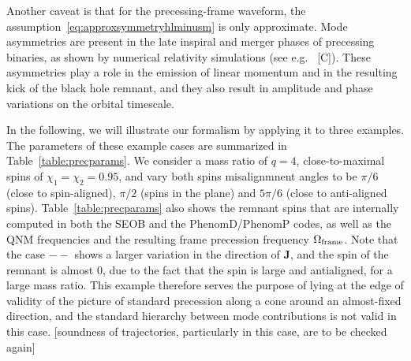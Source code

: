 \documentclass[aps,showpacs,twocolumn,
prd,superscriptaddress,nofootinbib]{revtex4-1}
\newcommand{\SM}[1]{{\color{Red} #1}}
\begin{document}
Another caveat is that for the precessing-frame waveform, the assumption~\eqref{eq:approxsymmetryhlminusm} is only approximate. Mode asymmetries are present in the late inspiral and merger phases of precessing binaries, as shown by numerical relativity simulations (see e.g.~\cite{} \SM{[C]}). These asymmetries play a role in the emission of linear momentum and in the resulting kick of the black hole remnant, and they also result in amplitude and phase variations on the orbital timescale.

In the following, we will illustrate our formalism by applying it to three examples. The parameters of these example cases are summarized in Table~\ref{table:precparams}. We consider a mass ratio of $q=4$, close-to-maximal spins of $\chi_{1} = \chi_{2} = 0.95$, and vary both spins misalignmnent angles to be $\pi/6$ (close to spin-aligned), $\pi/2$ (spins in the plane) and $5\pi/6$ (close to anti-aligned spins). Table~\ref{table:precparams} also shows the remnant spins that are internally computed in both the SEOB and the PhenomD/PhenomP codes, as well as the QNM frequencies and the resulting frame precession frequency $\Omega_{\rm frame}$. Note that the case $--$ shows a larger variation in the direction of $\bm{J}$, and the spin of the remnant is almost 0, due to the fact that the spin is large and antialigned, for a large mass ratio. This example therefore serves the purpose of lying at the edge of validity of the picture of standard precession along a cone around an almost-fixed direction, and the standard hierarchy between mode contributions is not valid in this case. \SM{[soundness of trajectories, particularly in this case, are to be checked again]}
\end{document}
